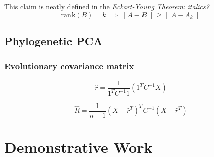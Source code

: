 \documentclass[12pt]{article}
\theoremstyle{definition}
\begin{document}
This claim is neatly defined in the \textit{Eckart-Young Theorem}: 
\textit{italics?}
\begin{equation}
	\mathrm{rank}(B) = k \implies \|A - B\| \ge \|A - A_k\|
	\label{eq:Eckart-Young}
\end{equation}

\subsection{Phylogenetic PCA}

\subsubsection{Evolutionary covariance matrix}






$$
\hat{r} = \frac{1}{\mathrm{1}^T C^{-1} \mathrm{1}} \left( \mathrm{1}^T C^{-1} X \right)
$$


$$
\hat{R} = \frac{1}{n-1} \left( X - \hat{r}^T \right)^T C^{-1} \left( X - \hat{r}^T \right)
$$





\section{Demonstrative Work}




\printbibliography
\end{document}
